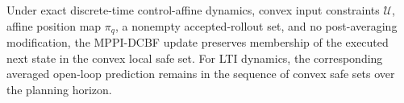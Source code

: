 \documentclass[letterpaper, 10 pt, conference]{ieeeconf}
\newtheorem{proposition}{Proposition}
\newtheorem{assumption}{Assumption}
\newcommand{\piq}{\pi_q}
\begin{document}
Under exact discrete-time control-affine dynamics, convex input constraints $\mathcal U$, affine position map $\piq$, a nonempty accepted-rollout set, and no post-averaging modification, the MPPI-DCBF update preserves membership of the executed next state in the convex local safe set. For LTI dynamics, the corresponding averaged open-loop prediction remains in the sequence of convex safe sets over the planning horizon.




    
\end{document}
